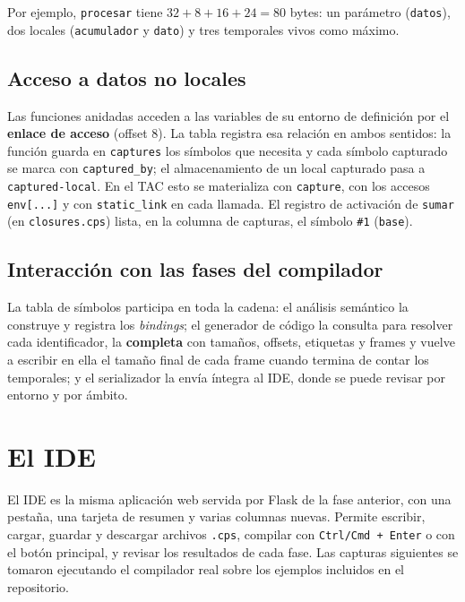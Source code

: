 \documentclass[11pt,a4paper]{article}
\begin{document}
Por ejemplo, \texttt{procesar} tiene $32 + 8 + 16 + 24 = 80$ bytes: un parámetro
(\texttt{datos}), dos locales (\texttt{acumulador} y \texttt{dato}) y tres
temporales vivos como máximo.

\subsection{Acceso a datos no locales}

Las funciones anidadas acceden a las variables de su entorno de definición por
el \textbf{enlace de acceso} (offset 8). La tabla registra esa relación en
ambos sentidos: la función guarda en \texttt{captures} los símbolos que
necesita y cada símbolo capturado se marca con \texttt{captured\_by}; el
almacenamiento de un local capturado pasa a \texttt{captured-local}. En el TAC
esto se materializa con \texttt{capture}, con los accesos \texttt{env[...]} y
con \texttt{static\_link} en cada llamada. El registro de activación de
\texttt{sumar} (en \texttt{closures.cps}) lista, en la columna de capturas, el
símbolo \texttt{\#1} (\texttt{base}).

\subsection{Interacción con las fases del compilador}

La tabla de símbolos participa en toda la cadena: el análisis semántico la
construye y registra los \emph{bindings}; el generador de código la consulta para
resolver cada identificador, la \textbf{completa} con tamaños, offsets,
etiquetas y frames y vuelve a escribir en ella el tamaño final de cada frame
cuando termina de contar los temporales; y el serializador la envía íntegra al
IDE, donde se puede revisar por entorno y por ámbito.

\section{El IDE}

El IDE es la misma aplicación web servida por Flask de la fase anterior, con
una pestaña, una tarjeta de resumen y varias columnas nuevas. Permite escribir,
cargar, guardar y descargar archivos \texttt{.cps}, compilar con
\texttt{Ctrl/Cmd + Enter} o con el botón principal, y revisar los resultados de
cada fase. Las capturas siguientes se tomaron ejecutando el compilador
real sobre los ejemplos incluidos en el repositorio.
\end{document}
